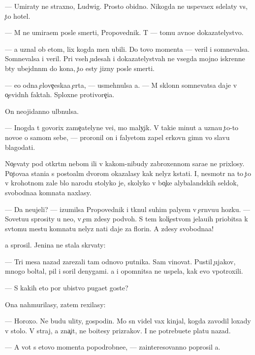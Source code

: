 \documentclass[10pt]{book}
\begin{document}
— Umiraty ne straxno, Ludwig. Prosto obidno. Nikogda ne uspeva{\y}ex sdelaty vs{\e}, {\c}to hotel.

— M{\yi} ne umira{\y}em posle smerti, Propovednik. T{\yi} — tomu {\y}avno{\y}e dokazatelystvo.

— {\Y}a uznal ob etom, lix kogda men{\ia} ubili. Do tovo momenta — veril i somnevalsa. Somnevalsa i veril. Pri vseh {\c}udesah i dokazatelystvah ne vsegda mojno iskrenne b{\yi}ty ubejd{\e}nn{\yi}m do kon{\q}a, {\c}to {\y}esty jizny posle smerti.

— {\Y}e{\x}o odna {\c}elove{\c}eska{\y}a {\c}erta, — usmehnulsa {\y}a. — M{\yi} sklonn{\yi} somnevatsa daje v o{\c}evidn{\yi}h faktah. Sploxn{\yi}{\y}e protivore{\c}i{\y}a.

On neojidanno ul{\yi}bnulsa.

— Inogda t{\yi} govorix zame{\c}atelyn{\yi}{\y}e ve{\x}i, mo{\y} maly{\c}ik. V taki{\y}e minut{\yi} {\y}a uzna{\y}u {\c}to-to novo{\y}e o samom sebe, — proronil on i faly{\q}etom zapel {\q}erkovn{\yi}{\y} gimn vo slavu blagodati.



No{\c}evaty pod otkr{\yi}t{\yi}m nebom ili v kakom-nibudy zabroxennom sara{\y}e ne prixlosy. Po{\c}tova{\y}a stan{\q}i{\y}a s posto{\y}al{\yi}m dvorom okazalasy kak nelyz{\ia} kstati. I, nesmotr{\ia} na to {\c}to v krohotnom zale b{\yi}lo narodu stolyko je, skolyko v bo{\c}ke alybalandskih sel{\e}dok, svobodna{\y}a komnata naxlasy.

— Da neujeli? — izumilsa Propovednik i tknul suhim paly{\q}em v {\c}ern{\ia}vu{\y}u hoz{\ia}{\y}ku. — Sovetu{\y}u sprosity u ne{\y}o, v {\c}em zdesy podvoh. S tem koli{\c}estvom jela{\y}u{\x}ih priob{\x}itsa k sv{\ia}tomu mestu komnatu nelyz{\ia} na{\y}ti daje za florin. A zdesy svobodna{\y}a!

{\Y}a sprosil. Jen{\x}ina ne stala skr{\yi}vaty:

— Tri mes{\ia}{\q}a nazad zarezali tam odnovo putnika. Sam vinovat. Pustil {\c}ujakov, mnogo boltal, pil i soril denygami. {\Y}a i opomnitsa ne uspela, kak {\y}evo v{\yi}potroxili.

— S kakih eto por ubi{\y}stvo puga{\y}et goste{\y}?

Ona nahmurilasy, zatem rexilasy:

— Horoxo. Ne budu {\y}ulity, gospodin. Mo{\y} s{\yi}n videl vax kinjal, kogda zavodil loxady v sto{\y}lo. V{\yi} straj, a zna{\c}it, ne bo{\y}itesy prizrakov. I ne potrebu{\y}ete platu nazad.

— A vot s etovo momenta popodrobne{\y}e, — zainteresovanno poprosil {\y}a.
\end{document}
